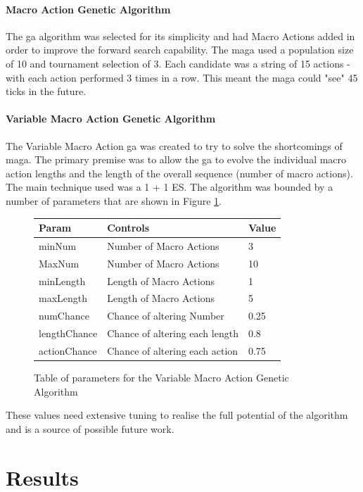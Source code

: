 \documentclass{IEEEtran}
\begin{document}
\paragraph{Macro Action Genetic Algorithm}
The \gls{ga} algorithm was selected for its simplicity and had Macro Actions added in order to improve the forward search capability. The \gls{maga} used a population size of 10 and tournament selection of 3. Each candidate was a string of 15 actions - with each action performed 3 times in a row. This meant the \gls{maga} could "see" 45 ticks in the future.
\paragraph{Variable Macro Action Genetic Algorithm}
The Variable Macro Action \gls{ga} was created to try to solve the shortcomings of \gls{maga}. The primary premise was to allow the \gls{ga} to evolve the individual macro action lengths and the length of the overall sequence (number of macro actions). The main technique used was a 1 + 1 ES. The algorithm was bounded by a number of parameters that are shown in Figure \ref{vmagaTable}.

\begin{figure}[h]
\centering
\begin{tabular}{| l | l | l |}
\hline
\textbf{Param} & \textbf{Controls} & \textbf{Value} \\
\hline
minNum & Number of Macro Actions & 3 \\
MaxNum & Number of Macro Actions & 10 \\
minLength & Length of Macro Actions & 1 \\
maxLength & Length of Macro Actions & 5 \\
numChance & Chance of altering Number & 0.25 \\
lengthChance & Chance of altering each length & 0.8 \\
actionChance & Chance of altering each action & 0.75 \\
\hline
\end{tabular}
\caption{Table of parameters for the Variable Macro Action Genetic Algorithm}
\label{vmagaTable}
\end{figure}
These values need extensive tuning to realise the full potential of the algorithm and is a source of possible future work.
\pagebreak
\section{Results}
\end{document}
